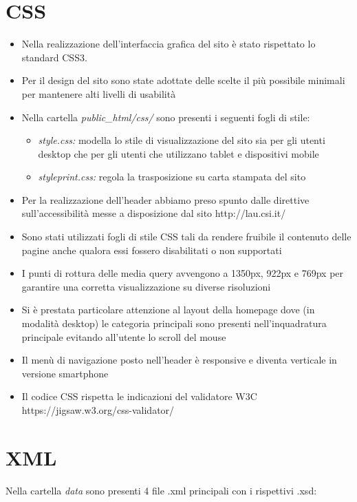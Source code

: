 \documentclass[12pt]{article}
\begin{document}
	\section{CSS}
	\begin{itemize}
	
	
		\item Nella realizzazione dell'interfaccia grafica del sito \`e stato rispettato lo standard CSS3.
		\item Per il design del sito sono state adottate delle scelte il pi\`u possibile minimali per mantenere alti livelli di usabilit\`a
		\item Nella cartella \textit{public\_html/css/} sono presenti i seguenti fogli di stile:
		\begin{itemize}

				\item \textit{style.css:} modella lo stile di visualizzazione del sito sia per gli utenti desktop che per gli utenti che utilizzano tablet e dispositivi mobile

				\item \textit{styleprint.css:} regola la trasposizione su carta stampata del sito
		\end{itemize}
\item Per la realizzazione dell'header abbiamo preso spunto dalle direttive sull'accessibilit\`a messe a disposizione dal sito http://lau.csi.it/
\item Sono stati utilizzati fogli di stile CSS tali da rendere fruibile il contenuto delle pagine anche qualora essi fossero disabilitati o non supportati
\item I punti di rottura delle media query avvengono a 1350px, 922px e 769px per garantire una corretta visualizzazione su diverse risoluzioni
\item Si \`e prestata particolare attenzione al layout della homepage dove (in modalit\`a desktop) le categoria principali sono presenti nell'inquadratura principale evitando all'utente lo scroll del mouse
\item Il men\`u di navigazione posto nell'header \`e responsive e diventa verticale in versione smartphone
\item Il codice CSS rispetta le indicazioni del validatore W3C \\https://jigsaw.w3.org/css-validator/
		\end{itemize}
					\newpage
				
		\section{XML}
	Nella cartella \textit{data} sono presenti 4 file .xml principali con i rispettivi .xsd:
\end{document}
